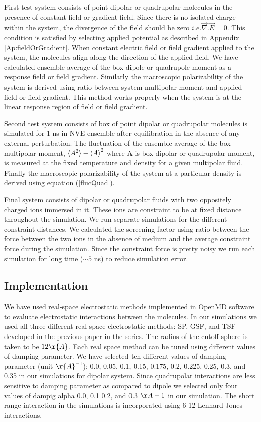 First test system consists of point dipolar or quadrupolar molecules in the presence of constant field or gradient field. Since there is no isolated charge within the system, the divergence of the field should be zero $ i.e. \vec{\nabla} .\vec{E} = 0$. This condition is satisfied by selecting applied potential as described in Appendix \ref{Ap:fieldOrGradient}.  When constant electric field or field gradient applied to the system, the molecules align along the direction of the applied field. We have calculated ensemble average of the box dipole or quadrupole moment as a response field or field gradient. Similarly the  macroscopic polarizability of the system is derived using ratio between system multipolar moment and applied field or field gradient. This method works properly when the system is at the linear response region of field or field gradient.    

Second test system consists of box of point dipolar or quadrupolar molecules is simulated for 1 ns in NVE ensemble after equilibration in the absence of any external perturbation. The fluctuation of the ensemble average of the box multipolar moment, $\braket{A^2} - \braket{A}^2 $ where A is box dipolar or quadrupolar moment,  is measured at the fixed temperature and density for a given multipolar fluid. Finally the macroscopic polarizability of the system at a particular density is derived using equation (\ref{flucQuad}).

Final system consists of dipolar or quadrupolar fluids with two oppositely charged ions immersed in it. These ions are constraint to be at fixed distance throughout the simulation. We run separate simulations for the different constraint distances. We calculated the screening factor using ratio between the force between the two ions in the absence of medium and the average constraint force during the simulation. Since the constraint force is pretty noisy we run each simulation for long time ($\sim 5$ ns) to reduce simulation error.

\subsection{Implementation}
We have used real-space electrostatic methods implemented in OpenMD \cite{openmd2.3} software to evaluate electrostatic interactions between the molecules. In our simulations we used all three different real-space electrostatic methods: SP, GSF, and TSF developed in the previous paper \cite{PaperI} in the series. The radius of the cutoff sphere is taken to be $12 \r{A}$. Each real space method can be tuned using different values of damping parameter. We have selected ten different values of damping parameter (unit-${\r{A}}^{-1}$); 0.0, 0.05, 0.1, 0.15, 0.175, 0.2, 0.225, 0.25, 0.3, and 0.35 in our simulations for dipolar system. Since quadrupolar interactions are less sensitive to damping parameter as compared to dipole we selected only four values of dampig alpha 0.0, 0.1 0.2, and 0.3 $\AA-1$ in our simulation. The short range interaction in the simulations is incorporated using 6-12 Lennard Jones interactions. 

